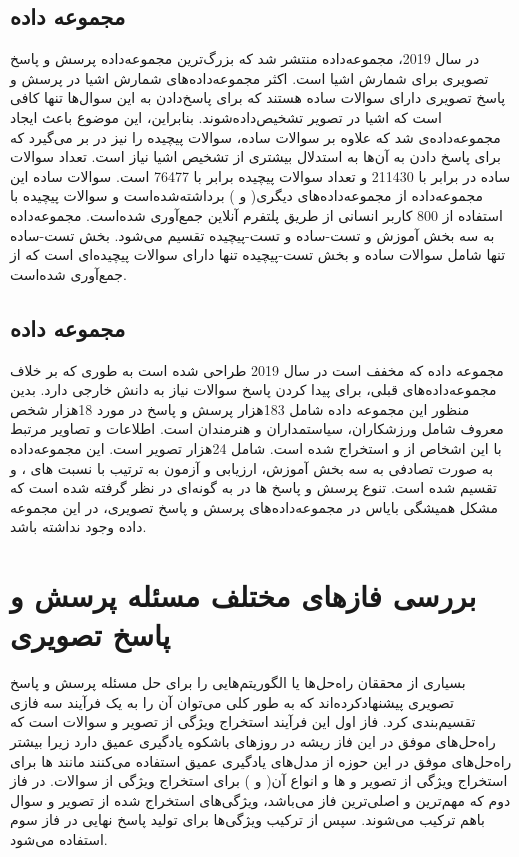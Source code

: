 \subsection{مجموعه داده \cite{acharya2019tallyqa}}

	در سال 2019، مجموعه‌داده 
منتشر شد که بزرگ‌ترین مجموعه‌داده پرسش و پاسخ تصویری برای شمارش اشیا است. اکثر مجموعه‌داده‌های شمارش اشیا در پرسش و پاسخ تصویری دارای سوالات ساده هستند که برای پاسخ‌دادن به این سوال‌‌ها تنها کافی است که اشیا در تصویر تشخیص‌داده‌شوند. بنابراین، این موضوع باعث ایجاد مجموعه‌داده‌ی 
  شد که علاوه بر سوالات ساده، سوالات پیچیده را نیز در بر می‌گیرد که برای پاسخ دادن به آن‌ها به استدلال بیشتری از تشخیص اشیا نیاز است. تعداد سوالات ساده در
  برابر با 211430 و تعداد سوالات پیچیده برابر با 76477 است. سوالات ساده این مجموعه‌داده از مجموعه‌داده‌های دیگری( 
   \cite{goyal2017making}
  و 
   \cite{krishna2017visual}
  ) برداشته‌شده‌است و سوالات پیچیده با استفاده از 800 کاربر انسانی از طریق پلتفرم آنلاین 
  جمع‌آوری شده‌است. مجموعه‌داده 
  به سه بخش آموزش و تست-ساده و تست-پیچیده تقسیم می‌شود. بخش تست-ساده تنها شامل سوالات ساده و بخش تست-پیچیده تنها دارای سوالات پیچیده‌ای است که از 
  جمع‌آوری شده‌است. 


\subsection{مجموعه داده \cite{shah2019kvqa}}
	مجموعه داده 
	 که مخفف
	است در سال 2019 طراحی شده است به طوری که بر خلاف مجموعه‌داده‌های قبلی، برای پیدا کردن پاسخ سوالات نیاز به دانش خارجی دارد. بدین منظور این مجموعه داده شامل 183هزار پرسش و پاسخ در مورد 18هزار شخص معروف شامل ورزشکاران، سیاستمداران و هنرمندان است.  اطلاعات و تصاویر مرتبط با این  اشخاص از
	و
	استخراج شده است.
شامل 24هزار تصویر است. این مجموعه‌داده به صورت تصادفی به سه بخش آموزش، ارزیابی و آزمون به ترتیب با نسبت های
 	، 
  و
   تقسیم شده است. تنوع پرسش و پاسخ ها در 
	به گونه‌ای در نظر گرفته شده است که مشکل همیشگی بایاس در مجموعه‌داده‌های پرسش و پاسخ تصویری، در این مجموعه داده وجود نداشته باشد.


\section{بررسی فازهای مختلف مسئله پرسش و پاسخ تصویری}
بسیاری از محققان راه‌حل‌ها یا الگوریتم‌هایی را برای حل مسئله پرسش و پاسخ تصویری پیشنهاد‌کرده‌اند که به طور کلی می‌توان آن را به یک فرآیند سه فازی تقسیم‌بندی کرد. فاز اول این فرآیند استخراج ویژگی از تصویر و سوالات است که راه‌حل‌های موفق در این فاز ریشه در روزهای باشکوه یادگیری عمیق دارد زیرا بیشتر راه‌حل‌های موفق در این حوزه از مدل‌های یادگیری عمیق استفاده می‌کنند مانند 
 ها برای استخراج ویژگی از  تصویر و 
  ها و انواع آن(
  و
  ) برای استخراج ویژگی از سوالات. در فاز دوم که مهم‌ترین و اصلی‌ترین فاز می‌باشد، ویژگی‌های استخراج شده از تصویر و سوال باهم ترکیب می‌شوند. سپس از ترکیب ویژگی‌ها برای تولید پاسخ نهایی در فاز سوم استفاده می‌شود.
